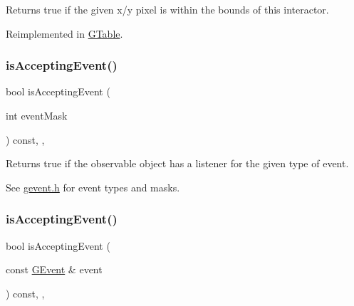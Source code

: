 Returns true if the given x/y pixel is within the bounds of this interactor. 



Reimplemented in \mbox{\hyperlink{classGTable_afa6b6241d2f7af75f2d1345f46acfc35}{G\+Table}}.

\mbox{\label{classGObservable_aeec1adc19aa0f33de62390686ee1382c}} 
\subsubsection{\texorpdfstring{is\+Accepting\+Event()}{isAcceptingEvent()}\hspace{0.1cm}{\footnotesize\ttfamily [1/3]}}
{\footnotesize\ttfamily bool is\+Accepting\+Event (\begin{DoxyParamCaption}\item[{int}]{event\+Mask }\end{DoxyParamCaption}) const\hspace{0.3cm}{\ttfamily [protected]}, {\ttfamily [virtual]}, {\ttfamily [inherited]}}



Returns true if the observable object has a listener for the given type of event. 

See \mbox{\hyperlink{gevent_8h_source}{gevent.\+h}} for event types and masks. \mbox{\label{classGObservable_aa31c73145a29dcb92848a92e0cfaea41}} 
\subsubsection{\texorpdfstring{is\+Accepting\+Event()}{isAcceptingEvent()}\hspace{0.1cm}{\footnotesize\ttfamily [2/3]}}
{\footnotesize\ttfamily bool is\+Accepting\+Event (\begin{DoxyParamCaption}\item[{const \mbox{\hyperlink{classGEvent}{G\+Event}} \&}]{event }\end{DoxyParamCaption}) const\hspace{0.3cm}{\ttfamily [protected]}, {\ttfamily [virtual]}, {\ttfamily [inherited]}}



